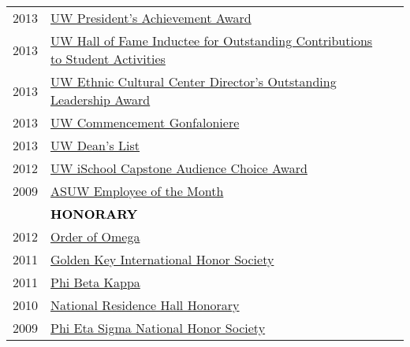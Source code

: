 \documentclass[11pt]{article}
\begin{document}
{{\begin{longtable}{Rp{0.75in}p{5.0in}}
\footnotesize{2013} & \href{https://www.washington.edu/omad/celebration/recognition-scholarship-recipients/2013-celebration-scholarship-recipients/}{UW President's Achievement Award}\\

\footnotesize{2013} & \href{https://depts.washington.edu/thehub/hub-events/hub-awards/}{UW Hall of Fame Inductee for Outstanding Contributions to Student Activities}\\

\footnotesize{2013} & \href{https://www.facebook.com/EthnicCulturalCenter/photos/a.10151638127531422.1073741830.124987626421/10151638128881422/}{UW Ethnic Cultural Center Director's Outstanding Leadership Award}\\

\footnotesize{2013} & \href{https://www.facebook.com/UWiSchool/posts/10151645734368695}{UW Commencement Gonfaloniere}\\

\footnotesize{2013} & \href{https://www.yakimaherald.com/news/education/school-news-sept/article_af5885a3-bcbc-5925-bb87-a84844c6d36a.html}{UW Dean's List}\\

\footnotesize{2012} & \href{https://ischool.uw.edu/capstone/projects/awards}{UW iSchool Capstone Audience Choice Award}\\

\footnotesize{2009} & \href{https://web.archive.org/web/20200328032852/https://wiki.asuw.org/index.php/Bryan_Dosono}{ASUW Employee of the Month}\\

& \textcolor{black}{\uppercase{\textbf{Honorary}}}\\

\footnotesize{2012} & \href{http://orderofomega.org/}{Order of Omega}\\

\footnotesize{2011} & \href{https://www.goldenkey.org/}{Golden Key International Honor Society}\\

\footnotesize{2011} & \href{https://www.pbk.org/}{Phi Beta Kappa}\\

\footnotesize{2010} & \href{http://students.washington.edu/nrhh/Relevant/Active\%20Members.html}{National Residence Hall Honorary}\\

\footnotesize{2009} & \href{https://www.phietasigma.org/}{Phi Eta Sigma National Honor Society}\\


\end{longtable}}}
\end{document}
